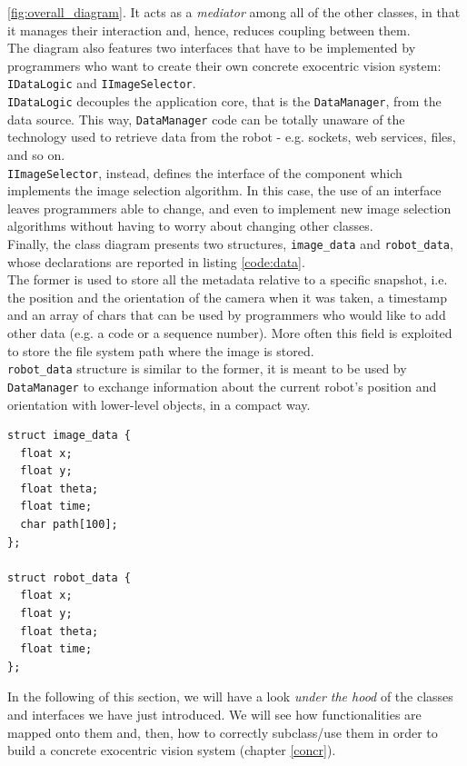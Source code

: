 \ref{fig:overall_diagram}.
It acts as a \textit{mediator} among all of the other classes, 
in that it manages their interaction and, hence, reduces 
coupling between them.
\\
The diagram also features two interfaces that have to be implemented 
by programmers who want to create their own concrete exocentric 
vision system: \texttt{IDataLogic} and 
\texttt{IImageSelector}.
\\
\texttt{IDataLogic} decouples the application 
core, that is the \texttt{DataManager}, from the data source.
This way, \texttt{DataManager} code can be totally unaware of 
the technology used to retrieve data from the robot - e.g. 
sockets, web services, files, and so on.
\\
\texttt{IImageSelector}, instead, defines the interface 
of the component which implements the image selection algorithm.
In this case, the use of an interface leaves programmers 
able to change, and even to implement new image 
selection algorithms without having to worry about
changing other classes.
\\
Finally, the class diagram presents two structures, 
\texttt{image\_data} and \texttt{robot\_data}, whose 
declarations are reported in listing \ref{code:data}.
\\
The former is used to store all the metadata 
relative to a specific snapshot, i.e. the position 
and the orientation of the camera when it was taken, 
a timestamp and an array of chars that can be used by 
programmers who would like to add other data (e.g. 
a code or a sequence number). More often this field is
exploited to store the file system path where the
image is stored.
\\
\texttt{robot\_data} structure is similar to the former,
it is meant to be 
used by \texttt{DataManager} to exchange information
about the current robot's position and orientation with 
lower-level objects, in a compact way.
\\
\begin{lstlisting}[caption={\framework{} data structures}, label={code:data}]
struct image_data {
  float x;
  float y;
  float theta;
  float time;
  char path[100];
};

struct robot_data {
  float x;
  float y;
  float theta;
  float time;
};
\end{lstlisting}

In the following of this section, we will have a look 
\textit{under the hood} of the classes and interfaces 
we have just introduced.
We will see how \framework{} functionalities are 
mapped onto them and, then, how to correctly subclass/use
them in order to build a concrete exocentric vision system
(chapter \ref{concr}).
